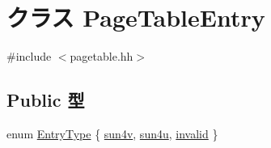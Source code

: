 \hypertarget{classSparcISA_1_1PageTableEntry}{
\section{クラス PageTableEntry}
\label{classSparcISA_1_1PageTableEntry}
}


{\ttfamily \#include $<$pagetable.hh$>$}\subsection*{Public 型}
\begin{DoxyCompactItemize}
\item 
enum \hyperlink{classSparcISA_1_1PageTableEntry_a9ed8d16c9ae7fae285dd2146c3159023}{EntryType} \{ \hyperlink{classSparcISA_1_1PageTableEntry_a9ed8d16c9ae7fae285dd2146c3159023a3b309a2e8c75af19cfced3b66b535eb6}{sun4v}, 
\hyperlink{classSparcISA_1_1PageTableEntry_a9ed8d16c9ae7fae285dd2146c3159023aef2b71a9a817d2bfc89fef7007765293}{sun4u}, 
\hyperlink{classSparcISA_1_1PageTableEntry_a9ed8d16c9ae7fae285dd2146c3159023aaf3d1efdf1095604d189748d8b46fc56}{invalid}
 \}
\end{DoxyCompactItemize}
